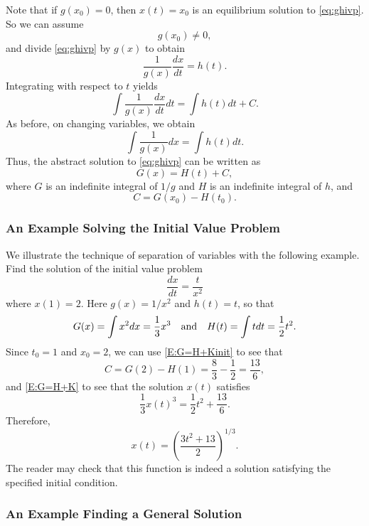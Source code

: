 \documentclass{ximera}
\begin{document}
Note that if $g(x_0)=0$, then $x(t)=x_0$ is an equilibrium solution to 
\eqref{eq:ghivp}.  So we can assume 
\begin{equation} \label{eq:gx0}
g(x_0)\not=0,
\end{equation}
and divide \eqref{eq:ghivp} by $g(x)$ to obtain
\[
\frac{1}{g(x)}\frac{dx}{dt}= h(t).
\]
Integrating with respect to $t$ yields
\[
\int \frac{1}{g(x)} \frac{dx}{dt}dt = \int h(t) dt + C.
\]
As before, on changing variables, we obtain
\[
\int\frac{1}{g(x)} dx = \int h(t) dt.
\]
Thus, the abstract solution to \eqref{eq:ghivp} can be written as
\begin{equation} \label{E:G=H+K}
G(x) = H(t) + C,
\end{equation}
where $G$ is an indefinite integral of $1/g$ and $H$ is an indefinite 
integral of $h$, and 
\begin{equation}  \label{E:G=H+Kinit}
C = G(x_0)-H(t_0).
\end{equation}



\subsubsection*{An Example Solving the Initial Value Problem}

We illustrate the technique of separation of variables with the following
example.  Find the solution of the initial value problem
\[
\frac{dx}{dt} = \frac{t}{x^2} 
\]
where $x(1)=2$.  Here $g(x) = 1/x^2$ and $h(t) = t$, so that
\[
G(x)=\int x^2 dx= \frac{1}{3}x^3 \quad\mbox{and}\quad H(t) = \int t dt = \frac{1}{2}t^2.
\]
Since $t_0=1$ and $x_0=2$, we can use \eqref{E:G=H+Kinit} to see that 
\[
C = G(2)-H(1) = \frac{8}{3} -\frac{1}{2} = \frac{13}{6},
\]
and \eqref{E:G=H+K} to see that the solution $x(t)$ satisfies
\[
\frac{1}{3}x(t)^3 = \frac{1}{2}t^2 + \frac{13}{6}.
\]
Therefore,
\[
x(t) = \left(\frac{3t^2+13}{2}\right)^{1/3}.
\]
The reader may check that this function is indeed a solution
satisfying the specified initial condition.

\subsubsection*{An Example Finding a General Solution}
\end{document}
